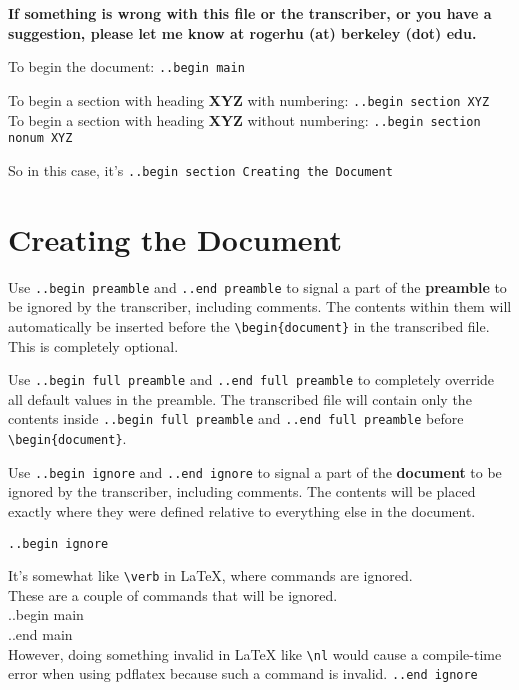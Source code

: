 \documentclass[12pt]{article}
\newcommand{\nl}{\\}
\renewcommand\bold{\textbf}
\numberwithin{equation}{section}
\begin{document}
\begin{flushleft}

\bold{If something is wrong with this file or the transcriber, or you have a suggestion, please let me know at rogerhu (at) berkeley (dot) edu.}

\bigskip

To begin the document: \verb|..begin main|

\bigskip

To begin a section with heading \bold{XYZ} with numbering: \verb|..begin section XYZ| \nl
To begin a section with heading \bold{XYZ} without numbering: \verb|..begin section nonum XYZ|

So in this case, it's \verb|..begin section Creating the Document|

\section{Creating the Document}

Use \verb|..begin preamble| and \verb|..end preamble| to signal a part of the \bold{preamble} to be ignored by the transcriber, including comments. The contents within them will automatically be inserted before the \verb|\begin{document}| in the transcribed file. This is completely optional.

\bigskip

Use \verb|..begin full preamble| and \verb|..end full preamble| to completely override all default values in the preamble. The transcribed file will contain only the contents inside \verb|..begin full preamble| and \verb|..end full preamble| before \verb|\begin{document}|.

\bigskip

Use \verb|..begin ignore| and \verb|..end ignore| to signal a part of the \bold{document} to be ignored by the transcriber, including comments. The contents will be placed exactly where they were defined relative to everything else in the document.

\verb|..begin ignore|

It's somewhat like \verb|\verb| in LaTeX, where commands are ignored. \\
These are a couple of commands that will be ignored. \\
..begin main \\
..end main \\
However, doing something invalid in LaTeX like \verb|\nl| would cause a compile-time error when using pdflatex because such a command is invalid. 
\verb|..end ignore|



\end{flushleft}
\end{document}
